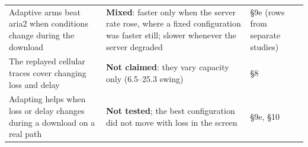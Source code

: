 \documentclass[10pt,a4paper]{article}
\begin{document}
{\begin{tabularx}{\linewidth}{@{}LLL@{}}
Adaptive arms beat aria2 when conditions change during the download & \textbf{Mixed}: faster only when the server rate rose, where a fixed configuration was faster still; slower whenever the server degraded & §9e (rows from separate studies)\\
The replayed cellular traces cover changing loss and delay & \textbf{Not claimed}: they vary capacity only (6.5–25.3 swing) & §8\\
Adapting helps when loss or delay changes during a download on a real path & \textbf{Not tested}; the best configuration did not move with loss in the screen & §9e, §10\\
\bottomrule
\end{tabularx}}
\end{document}
